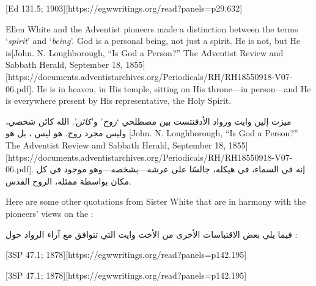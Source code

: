 [Ed 131.5; 1903][https://egwwritings.org/read?panels=p29.632]


Ellen White and the Adventist pioneers made a distinction between the terms ‘\textit{spirit}’ and ‘\textit{being}’. God is a personal being, not just a spirit. He is not, but He is[John. N. Loughborough, “Is God a Person?” The Adventist Review and Sabbath Herald, September 18, 1855][https://documents.adventistarchives.org/Periodicals/RH/RH18550918-V07-06.pdf]. He is in heaven, in His temple, sitting on His throne—in person—and He is everywhere present by His representative, the Holy Spirit.


ميزت إلين وايت ورواد الأدفنتست بين مصطلحي ‘\textit{روح}’ و’\textit{كائن}’. الله كائن شخصي، وليس مجرد روح. هو ليس ، بل هو [John. N. Loughborough, “Is God a Person?” The Adventist Review and Sabbath Herald, September 18, 1855][https://documents.adventistarchives.org/Periodicals/RH/RH18550918-V07-06.pdf]. إنه في السماء، في هيكله، جالسًا على عرشه—بشخصه—وهو موجود في كل مكان بواسطة ممثله، الروح القدس.


Here are some other quotations from Sister White that are in harmony with the pioneers’ views on the :


فيما يلي بعض الاقتباسات الأخرى من الأخت وايت التي تتوافق مع آراء الرواد حول :


[3SP 47.1; 1878][https://egwwritings.org/read?panels=p142.195]


[3SP 47.1; 1878][https://egwwritings.org/read?panels=p142.195]


